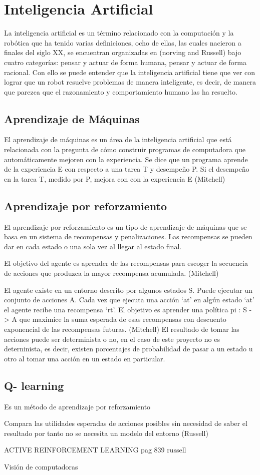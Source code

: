 \section{Inteligencia Artificial} \label{sect:Compiladores}
La inteligencia artificial es un término relacionado con la computación y la robótica que ha tenido varias definiciones, ocho de ellas, las cuales nacieron a finales del siglo XX, se encuentran organizadas en (norving and Russell) bajo cuatro categorías: pensar y actuar de forma humana, pensar y actuar de forma racional. Con ello se puede entender que la inteligencia artificial tiene que ver con lograr que un robot resuelve problemas de manera inteligente, es decir, de manera que parezca que el razonamiento y comportamiento humano las ha resuelto.  

\subsection{ Aprendizaje de Máquinas}
El aprendizaje de máquinas es un área de la inteligencia artificial que está relacionada con la pregunta de cómo construir programas de computadora que automáticamente mejoren con la experiencia. Se dice que un programa aprende de la experiencia E con respecto a una tarea T y desempeño P. Si el desempeño en la tarea T, medido por P, mejora con con la experiencia E (Mitchell) 

\subsection{Aprendizaje por reforzamiento}
El aprendizaje por reforzamiento es un tipo de aprendizaje de máquinas que se basa en un sistema de recompensas y penalizaciones. Las recompensas se pueden dar en cada estado o una sola vez al llegar al estado final.

El objetivo del agente es aprender de las recompensas para escoger la secuencia de acciones que produzca la mayor recompensa acumulada. (Mitchell) 

El agente existe en un entorno descrito por algunos estados S. Puede ejecutar un conjunto de acciones A. Cada vez que ejecuta una acción ‘at’ en algún estado ‘at’ el agente recibe una recompensa ‘rt’. El objetivo es aprender una política pi : S -> A que maximice la suma esperada de esas recompensas con descuento exponencial de las recompensas futuras. (Mitchell) El resultado de tomar las acciones puede ser determinista o no, en el caso de este proyecto no es deterninista, es decir, existen porcentajes de probabilidad de pasar a un estado u otro al tomar una acción en un estado en particular.  

\subsection{ Q- learning}

Es un método de aprendizaje por reforzamiento

Compara las utilidades esperadas de acciones posibles sin necesidad de saber el resultado por tanto no se necesita un modelo del entorno (Russell) 

ACTIVE REINFORCEMENT LEARNING pag 839 russell 

Visión de computadoras

